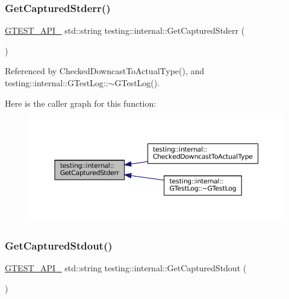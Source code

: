 \subsubsection{\texorpdfstring{Get\+Captured\+Stderr()}{GetCapturedStderr()}}
{\footnotesize\ttfamily \hyperlink{gtest-port_8h_aa73be6f0ba4a7456180a94904ce17790}{G\+T\+E\+S\+T\+\_\+\+A\+P\+I\+\_\+} std\+::string testing\+::internal\+::\+Get\+Captured\+Stderr (\begin{DoxyParamCaption}{ }\end{DoxyParamCaption})}



Referenced by Checked\+Downcast\+To\+Actual\+Type(), and testing\+::internal\+::\+G\+Test\+Log\+::$\sim$\+G\+Test\+Log().

Here is the caller graph for this function\+:
\nopagebreak
\begin{figure}[H]
\begin{center}
\leavevmode
\includegraphics[width=350pt]{namespacetesting_1_1internal_a374156401da17704099d0c33fa53adfb_icgraph}
\end{center}
\end{figure}
\mbox{\label{namespacetesting_1_1internal_aed657219a9856a8d249a3230de0c54ce}} 
\subsubsection{\texorpdfstring{Get\+Captured\+Stdout()}{GetCapturedStdout()}}
{\footnotesize\ttfamily \hyperlink{gtest-port_8h_aa73be6f0ba4a7456180a94904ce17790}{G\+T\+E\+S\+T\+\_\+\+A\+P\+I\+\_\+} std\+::string testing\+::internal\+::\+Get\+Captured\+Stdout (\begin{DoxyParamCaption}{ }\end{DoxyParamCaption})}



